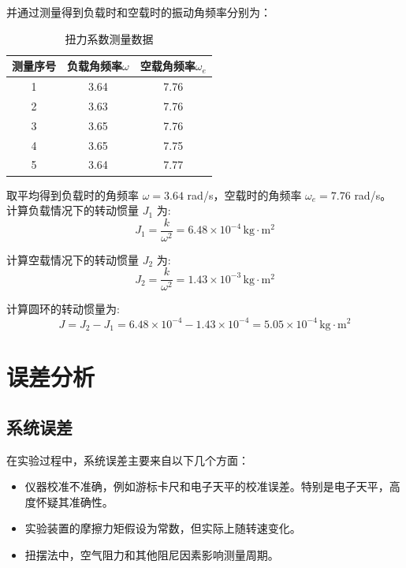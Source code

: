 \documentclass[UTF8]{ctexart}
\begin{document}
并通过测量得到负载时和空载时的振动角频率分别为：
\begin{table}[h]
    \centering
    \caption{扭力系数测量数据}
    \begin{tabular}{ccc}
        \toprule
        测量序号 & 负载角频率\(\omega\) & 空载角频率\(\omega_e\)   \\
        \midrule
        1 & 3.64 & 7.76 \\
        2 & 3.63 & 7.76 \\
        3 & 3.65 & 7.76 \\
        4 & 3.65 & 7.75 \\
        5 & 3.64 & 7.77 \\
        \bottomrule
    \end{tabular}
\end{table}
取平均得到负载时的角频率 \(\omega = 3.64\) rad/s，空载时的角频率 \(\omega_e = 7.76\) rad/s。
计算负载情况下的转动惯量 \(J_1\) 为:
\begin{equation}
J_1 = \frac{k}{\omega^2} =  6.48 \times 10^{-4} \, \text{kg} \cdot \text{m}^2
\end{equation}

计算空载情况下的转动惯量 \(J_2\) 为:
\begin{equation}
    J_2 = \frac{k}{\omega^2} = 1.43 \times 10^{-3} \, \text{kg} \cdot \text{m}^2
    \end{equation}
    
    计算圆环的转动惯量为:
    \begin{equation}
    J = J_2 - J_1 = 6.48 \times 10^{-4} - 1.43 \times 10^{-4} = 5.05 \times 10^{-4} \, \text{kg} \cdot \text{m}^2
    \end{equation}
    
    \section{误差分析}
    \subsection{系统误差}
    在实验过程中，系统误差主要来自以下几个方面：
    \begin{itemize}
        \item 仪器校准不准确，例如游标卡尺和电子天平的校准误差。特别是电子天平，高度怀疑其准确性。
        \item 实验装置的摩擦力矩假设为常数，但实际上随转速变化。
        \item 扭摆法中，空气阻力和其他阻尼因素影响测量周期。
    \end{itemize}
    
\end{document}
